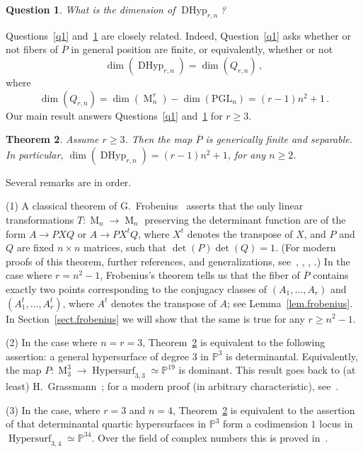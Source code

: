 \documentclass[12pt]{amsart}
\numberwithin{equation}{section}
\numberwithin{subsection}{section}
\newtheorem{theorem}{Theorem}[section]
\newtheorem{question}[theorem]{Question}
\theoremstyle{definition} \newtheorem{definition}[theorem]{Definition}
\newcommand\Hypersurf{\operatorname{Hypersurf}}
\newcommand\DHyp{\operatorname{DHyp}}
\newcommand{\PGL}{\mathrm{PGL}}
\newcommand{\Mat}{\operatorname{M}}
\newcommand{\bbP}{\mathbb{P}}
\begin{document}
\begin{question} \label{q2} What is the dimension of $\DHyp_{r, n}$?
\end{question}

Questions~\ref{q1} and~\ref{q2} are closely related. Indeed, 
Question~\ref{q1} asks whether or not fibers of $\overline{P}$
in general position are finite, or equivalently, whether or not 
\[ \dim(\DHyp_{r, n}) = \dim(Q_{r, n}) \, ,  \] 
where
\[ \dim(Q_{r, n}) = \dim(\Mat_n^r) - \dim(\PGL_n) = (r-1)n^2 + 1 \, . \]
Our main result answers Questions~\ref{q1} and~\ref{q2} for $r \geqslant 3$.

\begin{theorem} 
\label{thm.main}
Assume $r \geqslant 3$. Then the map $\overline{P}$ is generically 
finite and separable. In particular,  
$\dim(\DHyp_{r, n}) = (r-1)n^2 + 1$, for any $n \geqslant 2$.
\end{theorem}

Several remarks are in order.

\smallskip
(1) A classical theorem of G.~Frobenius~\cite[$\S$7.1]{frobenius} 
asserts 
that the only linear transformations $T \colon \Mat_n \to \Mat_n$
preserving the determinant function are of the form $A \to P X Q$ or
$A \to P X^t Q$, where $X^t$ denotes the transpose of $X$, and $P$ and $Q$
are fixed $n \times n$ matrices, such that $\det(P) \det(Q) = 1$. 
(For modern proofs of this theorem, further references, 
and generalizations, see~\cite{dieudonne}, \cite[Theorem 2]{mm}, 
\cite[Theorem 4.2]{waterhouse}, \cite[Corollary 8.9]{bgl}.)
In the case where $r = n^2 -1$, Frobenius's theorem tells us that
the fiber of $\overline{P}$ contains exactly two points corresponding to
the conjugacy classes of $(A_1, \dots, A_r)$ and $(A_1^t, \dots, A_r^t)$, 
where $A^t$ denotes the transpose of $A$; see Lemma~\ref{lem.frobenius}.
In Section~\ref{sect.frobenius}
we will show that the same is true for any $r \geqslant n^2 - 1$.

\smallskip
(2) In the case where $n= r= 3$, Theorem~\ref{thm.main} 
is equivalent to the following assertion:
a general hypersurface of degree $3$ in
$\bbP^3$ is determinantal. Equivalently, the map  
$P \colon \Mat_3^3 \to \Hypersurf_{3, 3} \simeq \bbP^{19}$ is 
dominant. This result goes back to (at least) 
H.~Grassmann~\cite{grassmann}; for a modern 
proof (in arbitrary characteristic), 
see~\cite[Corollary 6.4]{beauville}.  

\smallskip
(3) In the case, where $r = 3$ and $n = 4$, Theorem~\ref{thm.main} 
is equivalent to the assertion of that determinantal quartic 
hypersurfaces in $\bbP^3$ form a codimension $1$ 
locus in $\Hypersurf_{3, 4} \simeq \bbP^{34}$. 
Over the field of complex numbers this is proved 
in~\cite[Example 4.2.23]{dolgachev}. 
\end{document}

